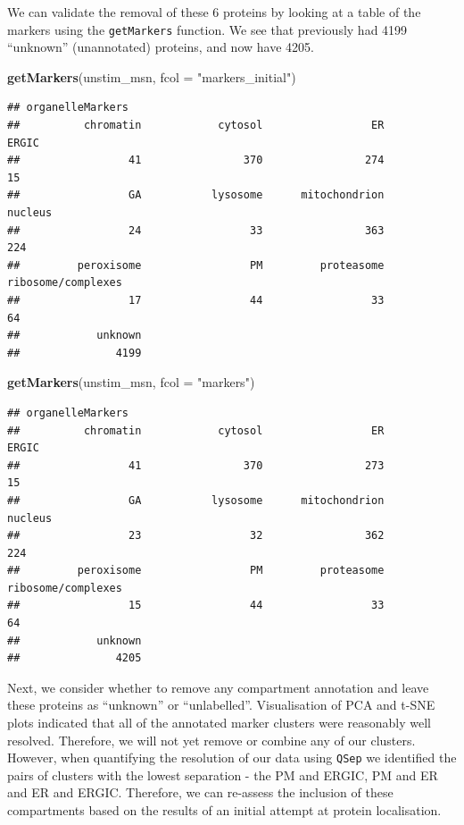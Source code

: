 \documentclass[9pt,a4paper,]{extarticle}
\newenvironment{Shaded}{\begin{snugshade}}{\end{snugshade}}
\newcommand{\AttributeTok}[1]{\textcolor[rgb]{0.13,0.29,0.53}{#1}}
\newcommand{\FunctionTok}[1]{\textcolor[rgb]{0.13,0.29,0.53}{\textbf{#1}}}
\newcommand{\NormalTok}[1]{#1}
\newcommand{\StringTok}[1]{\textcolor[rgb]{0.31,0.60,0.02}{#1}}
\begin{document}
We can validate the removal of these 6 proteins by looking at a table of the
markers using the \texttt{getMarkers} function. We see that previously had 4199
``unknown'' (unannotated) proteins, and now have 4205.

\begin{Shaded}
\begin{Highlighting}[]
\FunctionTok{getMarkers}\NormalTok{(unstim\_msn, }\AttributeTok{fcol =} \StringTok{"markers\_initial"}\NormalTok{)}
\end{Highlighting}
\end{Shaded}

\begin{verbatim}
## organelleMarkers
##          chromatin            cytosol                 ER              ERGIC 
##                 41                370                274                 15 
##                 GA           lysosome      mitochondrion            nucleus 
##                 24                 33                363                224 
##         peroxisome                 PM         proteasome ribosome/complexes 
##                 17                 44                 33                 64 
##            unknown 
##               4199
\end{verbatim}

\begin{Shaded}
\begin{Highlighting}[]
\FunctionTok{getMarkers}\NormalTok{(unstim\_msn, }\AttributeTok{fcol =} \StringTok{"markers"}\NormalTok{)}
\end{Highlighting}
\end{Shaded}

\begin{verbatim}
## organelleMarkers
##          chromatin            cytosol                 ER              ERGIC 
##                 41                370                273                 15 
##                 GA           lysosome      mitochondrion            nucleus 
##                 23                 32                362                224 
##         peroxisome                 PM         proteasome ribosome/complexes 
##                 15                 44                 33                 64 
##            unknown 
##               4205
\end{verbatim}

Next, we consider whether to remove any compartment annotation and leave these
proteins as ``unknown'' or ``unlabelled''. Visualisation of PCA and
t-SNE plots indicated that all of the annotated marker clusters were reasonably
well resolved. Therefore, we will not yet remove or combine any of our clusters.
However, when quantifying the resolution of our data using \texttt{QSep} we identified
the pairs of clusters with the lowest separation - the PM and ERGIC, PM and ER
and ER and ERGIC. Therefore, we can re-assess the inclusion of these compartments
based on the results of an initial attempt at protein localisation.
\end{document}
